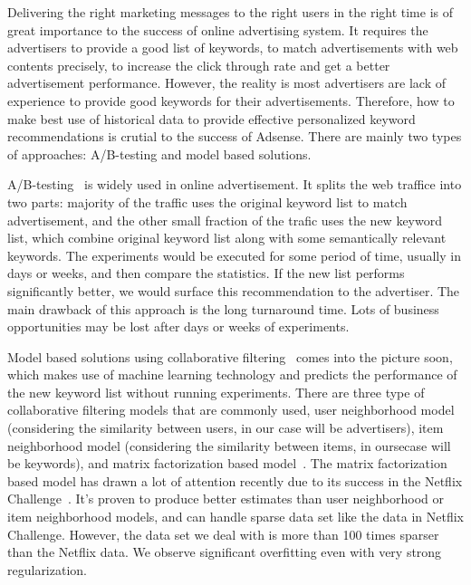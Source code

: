 Delivering the right marketing messages to the right users in the
right time is of great importance to the success of online advertising
system. It requires the advertisers to provide a good list of
keywords, to match advertisements with web contents precisely, to
increase the click through rate and get a better advertisement
performance.
%
However, the reality is most advertisers are lack of experience to
provide good keywords for their advertisements. Therefore, how to make
best use of historical data to provide effective personalized keyword
recommendations is crutial to the success of Adsense. There are mainly
two types of approaches: A/B-testing and model based solutions.
 
A/B-testing~\cite{abtest:wiki} is widely used in online
advertisement. It splits the web traffice into two parts: majority of
the traffic uses the original keyword list to match advertisement, and
the other small fraction of the trafic uses the new keyword list,
which combine original keyword list along with some semantically
relevant keywords.  The experiments would be executed for some period
of time, usually in days or weeks, and then compare the statistics. If
the new list performs significantly better, we would surface this
recommendation to the advertiser.  The main drawback of this approach
is the long turnaround time. Lots of business opportunities may be
lost after days or weeks of experiments.

Model based solutions using collaborative
filtering~\cite{resnick1997recommender,sarwar2001item} comes into the
picture soon, which makes use of machine learning technology and
predicts the performance of the new keyword list without running
experiments. There are three type of collaborative filtering models
that are commonly used, user neighborhood model (considering the
similarity between users, in our case will be advertisers), item
neighborhood model (considering the similarity between items, in
oursecase will be keywords), and matrix factorization based
model~\cite{}. The matrix factorization based model has drawn a lot of
attention recently due to its success in the Netflix
Challenge~\cite{}. It's proven to produce better estimates than user
neighborhood or item neighborhood models, and can handle sparse data
set like the data in Netflix Challenge.
%
However, the data set we deal with is more than 100 times sparser than
the Netflix data. We observe significant overfitting even with very
strong regularization.

